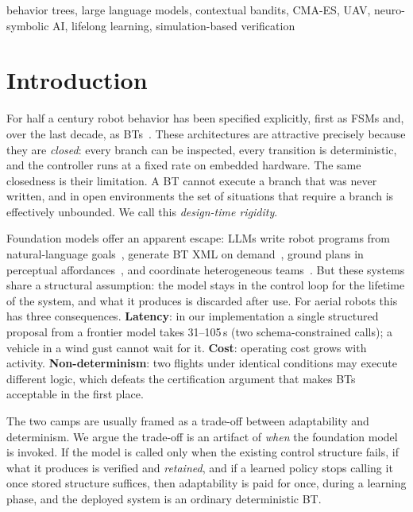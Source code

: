 \documentclass[conference]{IEEEtran}
\begin{document}
\begin{IEEEkeywords}
behavior trees, large language models, contextual bandits, CMA-ES, UAV, neuro-symbolic AI, lifelong learning, simulation-based verification
\end{IEEEkeywords}

\section{Introduction}
\label{sec:intro}

For half a century robot behavior has been specified explicitly, first as FSMs and, over the last decade, as BTs~\cite{colledanchise2018bt,iovino2022survey}. These architectures are attractive precisely because they are \emph{closed}: every branch can be inspected, every transition is deterministic, and the controller runs at a fixed rate on embedded hardware. The same closedness is their limitation. A BT cannot execute a branch that was never written, and in open environments the set of situations that require a branch is effectively unbounded. We call this \emph{design-time rigidity}.

Foundation models offer an apparent escape: LLMs write robot programs from natural-language goals~\cite{liang2023cap}, generate BT XML on demand~\cite{izzo2024btgenbot,zhou2024llmbt}, ground plans in perceptual affordances~\cite{ahn2022saycan,huang2023voxposer}, and coordinate heterogeneous teams~\cite{mandi2024roco,chen2024scalable}. But these systems share a structural assumption: the model stays in the control loop for the lifetime of the system, and what it produces is discarded after use. For aerial robots this has three consequences. \textbf{Latency}: in our implementation a single structured proposal from a frontier model takes 31--105\,s (two schema-constrained calls); a vehicle in a wind gust cannot wait for it. \textbf{Cost}: operating cost grows with activity. \textbf{Non-determinism}: two flights under identical conditions may execute different logic, which defeats the certification argument that makes BTs acceptable in the first place.

The two camps are usually framed as a trade-off between adaptability and determinism. We argue the trade-off is an artifact of \emph{when} the foundation model is invoked. If the model is called only when the existing control structure fails, if what it produces is verified and \emph{retained}, and if a learned policy stops calling it once stored structure suffices, then adaptability is paid for once, during a learning phase, and the deployed system is an ordinary deterministic BT.
\end{document}
